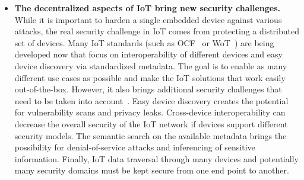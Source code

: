 \begin{itemize}
	\item \textbf{The decentralized aspects of IoT bring new security challenges.} While it is important to harden a single embedded device against various attacks, the real security challenge in IoT comes from protecting a distributed set of devices. Many IoT standards (such as OCF~\cite{ocf} or WoT~\cite{wot}) are being developed now that focus on interoperability of different devices and easy device discovery via standardized metadata. The goal is to enable as many different use cases as possible and make the IoT solutions that work easily out-of-the-box. However, it also brings additional security challenges that need to be taken into account~\cite{McCool2018}. Easy device discovery creates the potential for vulnerability scans and privacy leaks. Cross-device interoperability can decrease the overall security of the IoT network if devices support different security models. The semantic search on the available metadata brings the possibility for denial-of-service attacks and inferencing of sensitive information. Finally, IoT data traversal through many devices and potentially many security domains must be kept secure from one end point to another.
	

\end{itemize}
